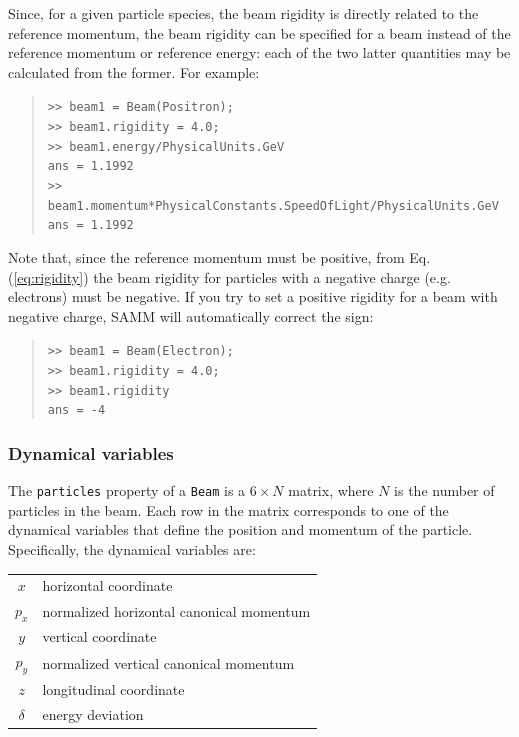 \documentclass[11pt,twoside,a4paper]{article}
\begin{document}
Since, for a given particle species, the beam rigidity is directly related to the reference
momentum, the beam rigidity can be specified for a beam instead of the reference
momentum or reference energy: each of the two latter quantities may be calculated
from the former.  For example:
\begin{quote}
\texttt{>> beam1 = Beam(Positron); \\
>> beam1.rigidity = 4.0; \\
>> beam1.energy/PhysicalUnits.GeV \\
ans = 1.1992 \\
>> beam1.momentum*PhysicalConstants.SpeedOfLight/PhysicalUnits.GeV \\
ans = 1.1992}
\end{quote}

Note that, since the reference momentum must be positive, from Eq.\,(\ref{eq:rigidity})
the beam rigidity for particles with a negative charge (e.g. electrons) must be negative.
If you try to set a positive rigidity for a beam with negative charge, SAMM will
automatically correct the sign:
\begin{quote}
\texttt{>> beam1 = Beam(Electron); \\
>> beam1.rigidity = 4.0; \\
>> beam1.rigidity \\
ans = -4}
\end{quote}


\subsubsection{Dynamical variables\label{sec:dynamicalvariables}}
The \texttt{particles} property of a \texttt{Beam} is a $6\times N$ matrix, where
$N$ is the number of particles in the beam.  Each row in the matrix corresponds to
one of the dynamical variables that define the position and momentum of the particle.
Specifically, the dynamical variables are:
\vspace{0.2in}

\begin{tabular}{cl}
$x$   & horizontal coordinate \\
$p_x$ & normalized horizontal canonical momentum \\
$y$   & vertical coordinate \\
$p_y$ & normalized vertical canonical momentum \\
$z$   & longitudinal coordinate \\
$\delta$ & energy deviation
\end{tabular}
\vspace{0.2in}
\end{document}
